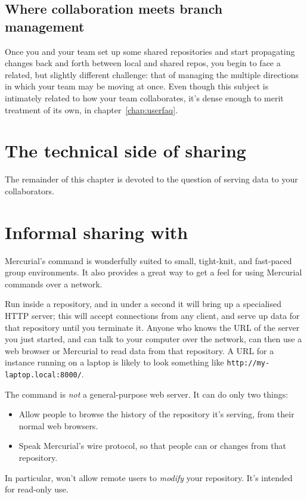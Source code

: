 \subsection{Where collaboration meets branch management}

Once you and your team set up some shared repositories and start
propagating changes back and forth between local and shared repos, you
begin to face a related, but slightly different challenge: that of
managing the multiple directions in which your team may be moving at
once.  Even though this subject is intimately related to how your team
collaborates, it's dense enough to merit treatment of its own, in
chapter~\ref{chap:userfaq}.

\section{The technical side of sharing}

The remainder of this chapter is devoted to the question of serving
data to your collaborators.

\section{Informal sharing with }
\label{sec:collab:serve}

Mercurial's  command is wonderfully suited to small,
tight-knit, and fast-paced group environments.  It also provides a
great way to get a feel for using Mercurial commands over a network.

Run  inside a repository, and in under a second it will
bring up a specialised HTTP server; this will accept connections from
any client, and serve up data for that repository until you terminate
it.  Anyone who knows the URL of the server you just started, and can
talk to your computer over the network, can then use a web browser or
Mercurial to read data from that repository.  A URL for a
 instance running on a laptop is likely to look something
like \Verb|http://my-laptop.local:8000/|.

The  command is \emph{not} a general-purpose web server.
It can do only two things:
\begin{itemize}
\item Allow people to browse the history of the repository it's
  serving, from their normal web browsers.
\item Speak Mercurial's wire protocol, so that people can
   or  changes from that repository.
\end{itemize}
In particular,  won't allow remote users to \emph{modify}
your repository.  It's intended for read-only use.

